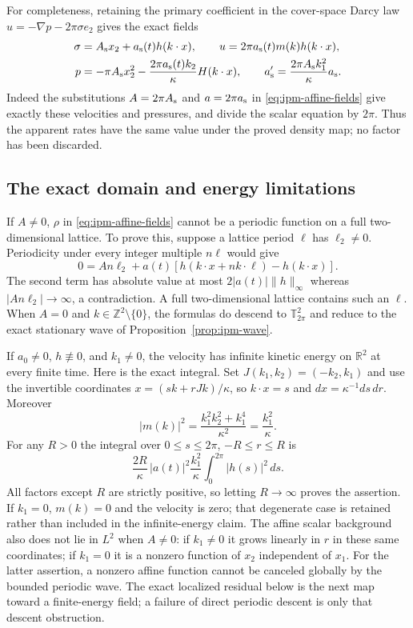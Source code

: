 For completeness, retaining the primary coefficient in the cover-space
Darcy law $u=-\nabla p-2\pi\sigma e_2$ gives the exact fields
\begin{align}\label{eq:ipm-source-affine}
 \sigma&=A_{\rm s}x_2+a_{\rm s}(t)h(k\cdot x),\qquad
 u=2\pi a_{\rm s}(t)m(k)h(k\cdot x),\\
 p&=-\pi A_{\rm s}x_2^2-
       \frac{2\pi a_{\rm s}(t)k_2}{\kappa}H(k\cdot x),\qquad
 a_{\rm s}'=\frac{2\pi A_{\rm s}k_1^2}{\kappa}a_{\rm s}.
 \notag
\end{align}
Indeed the substitutions $A=2\pi A_{\rm s}$ and $a=2\pi a_{\rm s}$ in
\eqref{eq:ipm-affine-fields} give exactly these velocities and pressures,
and divide the scalar equation by $2\pi$. Thus the apparent rates have the
same value under the proved density map; no factor has been discarded.

\subsection{The exact domain and energy limitations}

If $A\ne0$, $\rho$ in \eqref{eq:ipm-affine-fields} cannot be a periodic
function on a full two-dimensional lattice. To prove this, suppose a lattice
period $\ell$ has $\ell_2\ne0$. Periodicity under every integer multiple
$n\ell$ would give
\[
 0=An\ell_2+a(t)[h(k\cdot x+n k\cdot\ell)-h(k\cdot x)].
\]
The second term has absolute value at most $2|a(t)|\|h\|_\infty$ whereas
$|An\ell_2|\to\infty$, a contradiction. A full two-dimensional lattice
contains such an $\ell$. When $A=0$ and $k\in\mathbb Z^2\setminus\{0\}$,
the formulas do descend to $\mathbb T^2_{2\pi}$ and reduce to the exact
stationary wave of Proposition~\ref{prop:ipm-wave}.

If $a_0\ne0$, $h\not\equiv0$, and $k_1\ne0$, the velocity has infinite
kinetic energy on $\mathbb R^2$ at every finite time. Here is the exact
integral. Set $J(k_1,k_2)=(-k_2,k_1)$ and use the invertible coordinates
$x=(s k+rJk)/\kappa$, so $k\cdot x=s$ and $dx=\kappa^{-1}ds\,dr$.
Moreover
\[
 |m(k)|^2=\frac{k_1^2k_2^2+k_1^4}{\kappa^2}
          =\frac{k_1^2}{\kappa}.
\]
For any $R>0$ the integral over $0\le s\le2\pi$, $-R\le r\le R$ is
\[
 \frac{2R}{\kappa}\,|a(t)|^2\frac{k_1^2}{\kappa}
                  \int_0^{2\pi}|h(s)|^2\,ds.
\]
All factors except $R$ are strictly positive, so letting $R\to\infty$
proves the assertion. If $k_1=0$, $m(k)=0$ and the velocity is zero; that
degenerate case is retained rather than included in the infinite-energy
claim. The affine scalar background also does not lie in $L^2$ when
$A\ne0$: if $k_1\ne0$ it grows linearly in $r$ in these same coordinates;
if $k_1=0$ it is a nonzero function of $x_2$ independent of $x_1$.
For the latter assertion, a nonzero affine function cannot be canceled
globally by the bounded periodic wave. The exact localized residual below
is the next map toward a finite-energy field; a failure of direct periodic
descent is only that descent obstruction.
